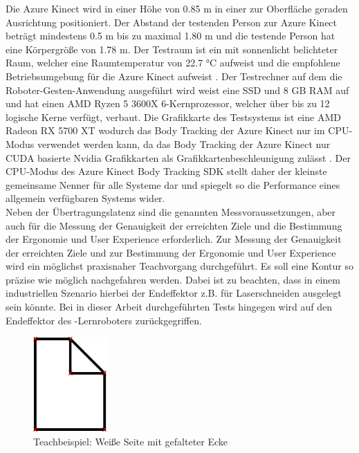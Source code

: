 Die Azure Kinect wird in einer Höhe von \num{0,85} m in einer zur Oberfläche geraden Ausrichtung positioniert. Der Abstand der testenden Person zur Azure Kinect beträgt mindestens \num{0,5} m bis zu maximal \num{1,80} m und die testende Person hat eine Körpergröße von \num{1,78} m. Der Testraum ist ein mit sonnenlicht belichteter Raum, welcher eine Raumtemperatur von \num{22,7} °C aufweist und die empfohlene Betriebsumgebung für die Azure Kinect aufweist \cite{tesych_azure_nodate}. Der Testrechner auf dem die Roboter-Gesten-Anwendung ausgeführt wird weist eine SSD und 8 GB RAM auf und hat einen AMD Ryzen 5 3600X 6-Kernprozessor, welcher über bis zu 12 logische Kerne verfügt, verbaut. Die Grafikkarte des Testsystems ist eine AMD Radeon RX 5700 XT wodurch das Body Tracking der Azure Kinect nur im CPU-Modus verwendet werden kann, da das Body Tracking der Azure Kinect nur CUDA basierte Nvidia Grafikkarten als Grafikkartenbeschleunigung zulässt \cite{encausse_body_nodate}. Der CPU-Modus des Azure Kinect Body Tracking SDK stellt daher der kleinste gemeinsame Nenner für alle Systeme dar und spiegelt so die Performance eines allgemein verfügbaren Systems wider.\\

Neben der Übertragungslatenz sind die genannten Messvoraussetzungen, aber auch für die Messung der Genauigkeit der erreichten Ziele und die Bestimmung der Ergonomie und User Experience erforderlich. Zur Messung der Genauigkeit der erreichten Ziele und zur Bestimmung der Ergonomie und User Experience wird ein möglichst praxisnaher Teachvorgang durchgeführt. Es soll eine Kontur so präzise wie möglich nachgefahren werden. Dabei ist zu beachten, dass in einem industriellen Szenario hierbei der Endeffektor z.B. für Laserschneiden ausgelegt sein könnte. Bei in dieser Arbeit durchgeführten Tests hingegen wird auf den Endeffektor des -Lernroboters zurückgegriffen.

\begin{figure}[htb]
	\centering
	\includegraphics[width=0.25\textwidth]{images/loesungsweg/white-page-with-folded-corner}
	\caption[Teachbeispiel: Weiße Seite mit gefalteter Ecke]{Teachbeispiel: Weiße Seite mit gefalteter Ecke}
	\label{fig:white_page_with_folded_corner}
\end{figure}
\FloatBarrier

